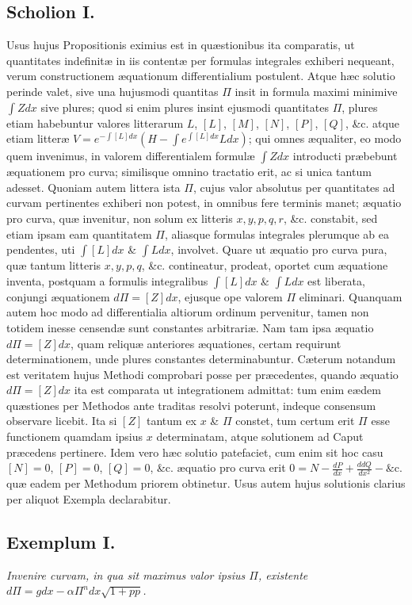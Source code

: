 \subsection*{Scholion I.}
 Usus hujus Propositionis eximius est in quæstionibus ita comparatis, ut quantitates indefinitæ in iis contentæ per formulas integrales exhiberi nequeant, verum constructionem æquationum differentialium postulent. Atque hæc solutio perinde valet, sive una hujusmodi quantitas $\Pi$ insit in formula maximi minimive $\int Zdx$ sive plures; quod si enim plures insint ejusmodi quantitates $\Pi$, plures etiam habebuntur valores litterarum $L$, $[L]$, $[M]$, $[N]$, $[P]$, $[Q]$, \&c. atque etiam litteræ $V=e^{-\int[L]dx}(H-\int e^{\int[L]dx}Ldx)$; qui omnes æqualiter, eo modo quem invenimus, in valorem differentialem formulæ $\int Zdx$ introducti præbebunt æquationem pro curva; similisque omnino tractatio erit, ac si unica tantum adesset. Quoniam autem littera ista $\Pi$, cujus valor absolutus per quantitates ad curvam pertinentes exhiberi non potest, in omnibus fere terminis manet; æquatio pro curva, quæ invenitur, non solum ex litteris $x,y,p,q,r$, \&c. constabit, sed etiam ipsam eam quantitatem $\Pi$, aliasque formulas integrales plerumque ab ea pendentes, uti $\int[L]dx$ \& $\int Ldx$, involvet. Quare ut æquatio pro curva pura, quæ tantum litteris $x,y,p,q$, \&c. contineatur, prodeat, oportet cum æquatione inventa, postquam a formulis integralibus $\int[L]dx$ \& $\int Ldx$ est liberata, conjungi æquationem $d\Pi=[Z]dx$, ejusque ope valorem $\Pi$ eliminari. Quanquam autem hoc modo ad differentialia altiorum ordinum pervenitur, tamen non totidem inesse censendæ sunt constantes arbitrariæ. Nam tam ipsa æquatio $d\Pi=[Z]dx$, quam reliquæ anteriores æquationes, certam requirunt determinationem, unde plures constantes determinabuntur. Cæterum notandum est veritatem hujus Methodi comprobari posse per præcedentes, quando æquatio $d\Pi=[Z]dx$ ita est comparata ut integrationem admittat: tum enim eædem quæstiones per Methodos ante traditas resolvi poterunt, indeque consensum observare licebit. Ita si $[Z]$ tantum ex $x$ \& $\Pi$ constet, tum certum erit $\Pi$ esse functionem
quamdam ipsius $x$ determinatam, atque solutionem ad Caput præcedens pertinere. Idem vero hæc solutio patefaciet, cum enim sit hoc casu $[N]=0$, $[P]=0$, $[Q]=0$, \&c. æquatio pro curva erit $0=N-\frac{dP}{dx}+\frac{ddQ}{dx^2}-\text{\&c.}$ quæ eadem per Methodum priorem obtinetur. Usus autem hujus solutionis clarius per aliquot Exempla declarabitur.
\subsection*{Exemplum I.}
 \textit{Invenire curvam, in qua sit maximus valor ipsius $\Pi$, existente $d\Pi=gdx-\alpha\Pi^n dx\sqrt{1+pp}$.}

